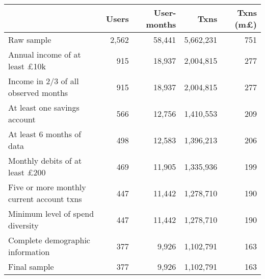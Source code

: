 \begin{tabular}{lrrrr}
\toprule
                                          & Users & User-months &      Txns & Txns (m\pounds) \\
\midrule
                               Raw sample & 2,562 &      58,441 & 5,662,231 &             751 \\
     Annual income of at least \pounds10k &   915 &      18,937 & 2,004,815 &             277 \\
     Income in 2/3 of all observed months &   915 &      18,937 & 2,004,815 &             277 \\
             At least one savings account &   566 &      12,756 & 1,410,553 &             209 \\
                At least 6 months of data &   498 &      12,583 & 1,396,213 &             206 \\
    Monthly debits of at least \pounds200 &   469 &      11,905 & 1,335,936 &             199 \\
Five or more monthly current account txns &   447 &      11,442 & 1,278,710 &             190 \\
         Minimum level of spend diversity &   447 &      11,442 & 1,278,710 &             190 \\
         Complete demographic information &   377 &       9,926 & 1,102,791 &             163 \\
                             Final sample &   377 &       9,926 & 1,102,791 &             163 \\
\bottomrule
\end{tabular}
